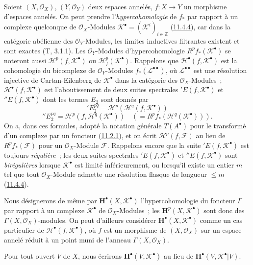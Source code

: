 \begin{env}[12.4.1]
\label{0.12.4.1-fr}
Soient $(X,\mathcal O_X)$, $(Y,\mathcal O_Y)$ deux espaces annelés,
$f:X\to Y$ un morphisme d'espaces annelés. On peut prendre
l'\emph{hypercohomologie} de $f_*$ par rapport à un complexe quelconque de
$\mathcal O_X$-Modules
$\mathcal K^\bullet=(\mathcal K^i)_{i\in\mathbb Z}$
(\hyperref[0.11.4.4-fr]{11.4.4}), car dans la catégorie abélienne des
$\mathcal O_Y$-Modules, les limites inductives filtrantes existent et sont
exactes (T, 3.1.1). Les $\mathcal O_Y$-Modules d'hypercohomologie
$R^p f_*(\mathcal K^\bullet)$ se noteront aussi
$\mathcal H^p(f,\mathcal K^\bullet)$ ou
$\mathcal H_f^p(\mathcal K^\bullet)$. Rappelons que
$\mathcal H^\bullet(f,\mathcal K^\bullet)$ est la cohomologie du bicomplexe
de $\mathcal O_Y$-Modules $f_*(\mathcal L^{\bullet\bullet})$, où
$\mathcal L^{\bullet\bullet}$ est une résolution injective de
Cartan-Eilenberg de $\mathcal K^\bullet$ dans la catégorie des
$\mathcal O_X$-Modules~; $\mathcal H^\bullet(f,\mathcal K^\bullet)$ est
l'aboutissement de deux suites spectrales
${}'E(f,\mathcal K^\bullet)$ et ${}''E(f,\mathcal K^\bullet)$ dont les
termes $E_2$ sont donnés par
\begin{equation}
\label{0.12.4.1.1-fr}
\tag{12.4.1.1}
{}'E_2^{pq}=\mathcal H^p(\mathcal H^q(f,\mathcal K^\bullet))
\end{equation}
\begin{equation}
\label{0.12.4.1.2-fr}
\tag{12.4.1.2}
{}''E_2^{pq}=\mathcal H^p(f,\mathcal H^q(\mathcal K^\bullet))
\quad(=R^p f_*(\mathcal H^q(\mathcal K^\bullet))).
\end{equation}
On a, dans ces formules, adopté la notation générale $T(A^\bullet)$ pour
le transformé d'un complexe par un foncteur
(\hyperref[0.11.2.1-fr]{11.2.1}), et on écrit
$\mathcal H^p(f,\mathcal F)$ au lieu de $R^p f_*(\mathcal F)$ pour un
$\mathcal O_X$-Module $\mathcal F$. Rappelons encore que la suite
${}'E(f,\mathcal K^\bullet)$ est toujours \emph{régulière}~; les deux
suites spectrales ${}'E(f,\mathcal K^\bullet)$ et
${}''E(f,\mathcal K^\bullet)$ sont \emph{birégulières} lorsque
$\mathcal K^\bullet$ est limité inférieurement,
ou lorsqu'il existe un entier $m$ tel que tout $\mathcal O_X$-Module
admette une résolution flasque de longueur $\leq m$
(\hyperref[0.11.4.4-fr]{11.4.4}).
\end{env}

\begin{env}[12.4.2]
\label{0.12.4.2-fr}
Nous désignerons de même par $\mathbf H^\bullet(X,\mathcal K^\bullet)$
l'hypercohomologie du foncteur $\Gamma$ par rapport à un complexe
$\mathcal K^\bullet$ de $\mathcal O_X$-Modules~; les
$\mathbf H^p(X,\mathcal K^\bullet)$ sont donc des
$\Gamma(X,\mathcal O_X)$-modules. On peut d'ailleurs considérer
$\mathbf H^\bullet(X,\mathcal K^\bullet)$ comme un cas particulier de
$\mathcal H^\bullet(f,\mathcal K^\bullet)$, où $f$ est un morphisme de
$(X,\mathcal O_X)$ sur un espace annelé réduit à un point muni de l'anneau
$\Gamma(X,\mathcal O_X)$.

Pour tout ouvert $V$ de $X$, nous écrirons
$\mathbf H^\bullet(V,\mathcal K^\bullet)$ au lieu de
$\mathbf H^\bullet(V,\mathcal K^\bullet|V)$.
\end{env}


